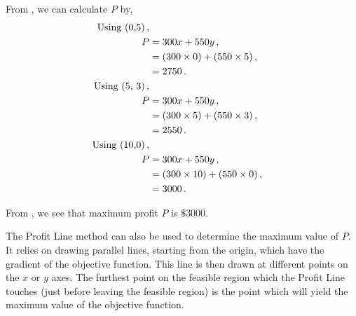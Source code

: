 \begin{subquestions}

\subquestion

From , we can calculate $P$ by,
\begin{align}
	\text{Using (0,5)} \,, \nonumber \\
	P & = 300x + 550y \,, \nonumber \\
	& = (300 \times 0) + (550 \times 5) \,, \nonumber \\
	& = 2750 \,.  \\
	\text{Using (5, 3)} \,, \nonumber \\
	P & = 300x + 550y \,, \nonumber \\
	& = (300 \times 5) + (550 \times 3) \,, \nonumber \\
	& = 2550 \,.    \\		  
	\text{Using (10,0)} \,, \nonumber \\
	P & = 300x + 550y \,, \nonumber \\
	& = (300 \times 10) + (550 \times 0) \,, \nonumber \\
	& = 3000 \,. \label{2005:q2:eqn:Profit}
\end{align}

From , we see that maximum profit $P$ is $ \$ 3000$.


\subquestion

The Profit Line method can also be used to determine the maximum value of $P$. It relies on drawing parallel lines, starting from the origin, which have the gradient of the objective function. This line is then drawn at different points on the $x$ or $y$ axes. The furthest point on the feasible region which the Profit Line touches (just before leaving the feasible region) is the point which will yield the maximum value of the objective function. 

\end{subquestions}

